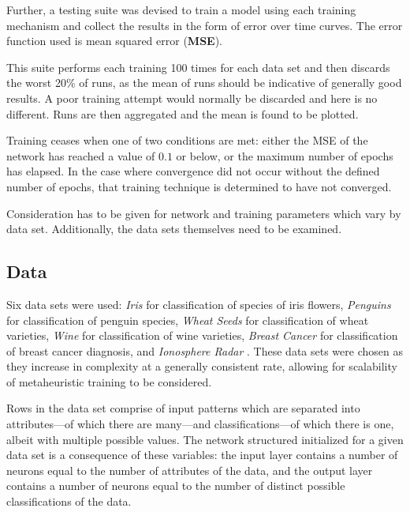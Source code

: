 \documentclass[a4paper,12pt]{article}
\begin{document}
Further, a testing suite was devised to train a model using each training mechanism and collect the results in the form of error over time curves. The error function used is mean squared error (\textbf{MSE}).

This suite performs each training 100 times for each data set and then discards the worst 20\% of runs, as the mean of runs should be indicative of generally good results. A poor training attempt would normally be discarded and here is no different. Runs are then aggregated and the mean is found to be plotted.

Training ceases when one of two conditions are met: either the MSE of the network has reached a value of $0.1$ or below, or the maximum number of epochs has elapsed. In the case where convergence did not occur without the defined number of epochs, that training technique is determined to have not converged.

Consideration has to be given for network and training parameters which vary by data set. Additionally, the data sets themselves need to be examined.

\subsection{Data}

Six data sets were used: \textit{Iris} \cite{data} for classification of species of iris flowers, \textit{Penguins} \cite{penguins} for classification of penguin species, \textit{Wheat Seeds} \cite{data} for classification of wheat varieties, \textit{Wine} \cite{data} for classification of wine varieties, \textit{Breast Cancer} \cite{data} for classification of breast cancer diagnosis, and \textit{Ionosphere Radar} \cite{data}. These data sets were chosen as they increase in complexity at a generally consistent rate, allowing for scalability of metaheuristic training to be considered.

Rows in the data set comprise of input patterns which are separated into attributes---of which there are many---and classifications---of which there is one, albeit with multiple possible values. The network structured initialized for a given data set is a consequence of these variables: the input layer contains a number of neurons equal to the number of attributes of the data, and the output layer contains a number of neurons equal to the number of distinct possible classifications of the data.
\end{document}
